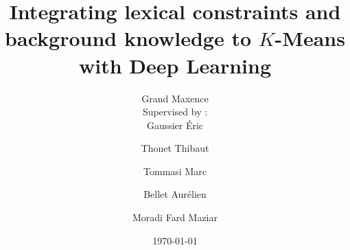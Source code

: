 \title{Integrating lexical constraints and background knowledge to $K$-Means with Deep Learning}
\author{Grand Maxence\\                                                   
        Supervised by : \\Gaussier \'Eric \and Thonet Thibaut \\ \and Tommasi Marc \and Bellet Aur\'elien  \and Moradi Fard Maziar } 
\date{\today}

